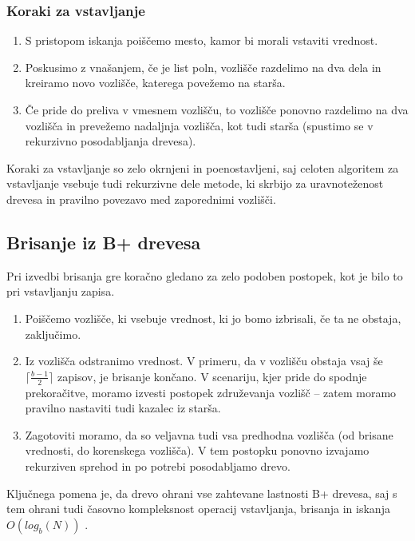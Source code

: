 \documentclass[a4paper,12pt,openright]{book}
\begin{document}
        \subsubsection{Koraki za vstavljanje}
        
        \begin{enumerate}
            \item S pristopom iskanja poiščemo mesto, kamor bi morali vstaviti vrednost.
            \item Poskusimo z vnašanjem, če je list poln, vozlišče razdelimo na dva dela in kreiramo novo vozlišče, katerega povežemo na starša.
            \item Če pride do preliva v vmesnem vozlišču, to vozlišče ponovno razdelimo na dva vozlišča in prevežemo nadaljnja vozlišča, kot tudi starša (spustimo se v rekurzivno posodabljanja drevesa).
        \end{enumerate}

        \noindent
        Koraki za vstavljanje so zelo okrnjeni in poenostavljeni, saj celoten algoritem za vstavljanje vsebuje tudi rekurzivne dele metode, ki skrbijo za uravnoteženost drevesa in pravilno povezavo med zaporednimi vozlišči.

        \subsection{Brisanje iz B+ drevesa}

        Pri izvedbi brisanja gre koračno gledano za zelo podoben postopek, kot je bilo to pri vstavljanju zapisa.

        \begin{enumerate}
            \item Poiščemo vozlišče, ki vsebuje vrednost, ki jo bomo izbrisali, če ta ne obstaja, zaključimo.
            \item Iz vozlišča odstranimo vrednost. V primeru, da v vozlišču obstaja vsaj še $\lceil \frac{b - 1}{2}\rceil$ zapisov, je brisanje končano. V scenariju, kjer pride do spodnje prekoračitve, moramo izvesti postopek združevanja vozlišč – zatem moramo pravilno nastaviti tudi kazalec iz starša.
            \item Zagotoviti moramo, da so veljavna tudi vsa predhodna vozlišča (od brisane vrednosti, do korenskega vozlišča). V tem postopku ponovno izvajamo rekurziven sprehod in po potrebi posodabljamo drevo.
        \end{enumerate}

        \noindent
        Ključnega pomena je, da drevo ohrani vse zahtevane lastnosti B+ drevesa, saj s tem ohrani tudi časovno kompleksnost operacij vstavljanja, brisanja in iskanja $O(log_b(N))$ \cite{goodrich2011data}.
\end{document}
